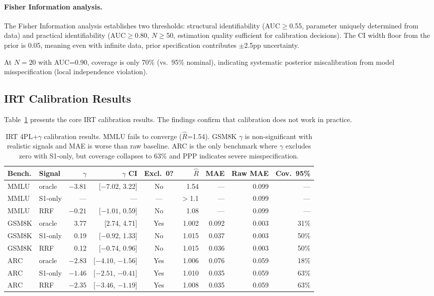 \documentclass[11pt,a4paper]{article}
\begin{document}
\paragraph{Fisher Information analysis.}
The Fisher Information analysis establishes two thresholds: structural identifiability (AUC$\geq$0.55, parameter uniquely determined from data) and practical identifiability (AUC$\geq$0.80, $N\geq$50, estimation quality sufficient for calibration decisions).
The CI width floor from the prior is 0.05, meaning even with infinite data, prior specification contributes $\pm$2.5pp uncertainty.

At $N=20$ with AUC=0.90, coverage is only 70\% (vs.\ 95\% nominal), indicating systematic posterior miscalibration from model misspecification (local independence violation).

\subsection{IRT Calibration Results}
\label{sec:calibration}

Table~\ref{tab:irt-results} presents the core IRT calibration results.
The findings confirm that calibration does not work in practice.

\begin{table}[t]
\centering
\small
\caption{IRT 4PL+$\gamma$ calibration results. MMLU fails to converge ($\hat{R}$=1.54). GSM8K $\gamma$ is non-significant with realistic signals and MAE is worse than raw baseline. ARC is the only benchmark where $\gamma$ excludes zero with S1-only, but coverage collapses to 63\% and PPP indicates severe misspecification.}
\label{tab:irt-results}
\begin{tabular}{llrrcrrrr}
\toprule
\textbf{Bench.} & \textbf{Signal} & $\gamma$ & \textbf{$\gamma$ CI} & \textbf{Excl.\ 0?} & $\hat{R}$ & \textbf{MAE} & \textbf{Raw MAE} & \textbf{Cov.\ 95\%} \\
\midrule
MMLU & oracle & $-3.81$ & [$-7.02$, 3.22] & No & 1.54 & --- & 0.099 & --- \\
MMLU & S1-only & --- & --- & --- & $>$1.1 & --- & 0.099 & --- \\
MMLU & RRF & $-0.21$ & [$-1.01$, 0.59] & No & 1.08 & --- & 0.099 & --- \\
\midrule
GSM8K & oracle & 3.77 & [2.74, 4.71] & Yes & 1.002 & 0.092 & 0.003 & 31\% \\
GSM8K & S1-only & 0.19 & [$-0.92$, 1.33] & No & 1.015 & 0.037 & 0.003 & 50\% \\
GSM8K & RRF & 0.12 & [$-0.74$, 0.96] & No & 1.015 & 0.036 & 0.003 & 50\% \\
\midrule
ARC & oracle & $-2.83$ & [$-4.10$, $-1.56$] & Yes & 1.006 & 0.076 & 0.059 & 18\% \\
ARC & S1-only & $-1.46$ & [$-2.51$, $-0.41$] & Yes & 1.010 & 0.035 & 0.059 & 63\% \\
ARC & RRF & $-2.35$ & [$-3.46$, $-1.19$] & Yes & 1.008 & 0.035 & 0.059 & 63\% \\
\bottomrule
\end{tabular}
\end{table}
\end{document}
